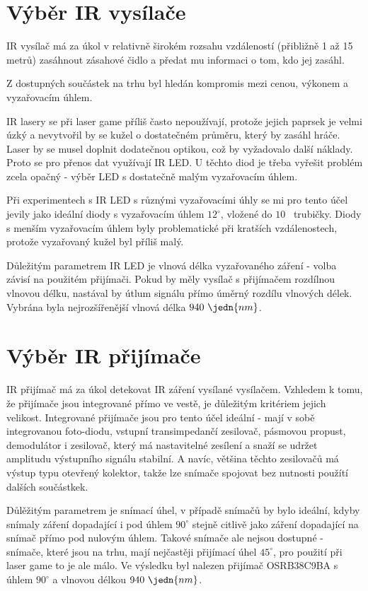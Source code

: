\section{Výběr IR vysílače}
IR vysílač má za úkol v relativně širokém rozsahu vzdáleností (přibližně 1 až 15 metrů) zasáhnout zásahové čidlo a předat mu informaci o tom, kdo jej zasáhl.

Z dostupných součástek na trhu byl hledán kompromis mezi cenou, výkonem a vyzařovacím úhlem.

IR lasery se při laser game příliš často nepoužívají, protože jejich paprsek je velmi úzký a nevytvořil by se kužel o dostatečném průměru, který by zasáhl hráče. Laser by se musel doplnit dodatečnou optikou, což by vyžadovalo další náklady. Proto se pro přenos dat využívají IR LED. U těchto diod je třeba vyřešit problém zcela opačný - výběr LED s dostatečně malým vyzařovacím úhlem.

Při experimentech s IR LED s různými vyzařovacími úhly se mi pro tento účel jevily jako ideální diody s vyzařovacím úhlem $12^\circ$, vložené do $10$~ trubičky. Diody s menším vyzařovacím úhlem byly problematické při kratších vzdálenostech, protože vyzařovaný kužel byl příliš malý.

Důležitým parametrem IR LED je vlnová délka vyzařovaného záření - volba závisí na použitém přijímači. Pokud by měly vysílač s přijímačem rozdílnou vlnovou délku, nastával by útlum signálu přímo úměrný rozdílu vlnových délek. Vybrána byla nejrozšířenější vlnová délka $940~\jedn{nm}$.

\section{Výběr IR přijímače}
IR přijímač má za úkol detekovat IR záření vysílané vysílačem. Vzhledem k tomu, že přijímače jsou integrované přímo ve vestě, je důležitým kritériem jejich velikost. Integrované přijímače jsou pro tento účel ideální - mají v sobě integrovanou foto-diodu, vstupní transimpedančí zesilovač, pásmovou propust, demodulátor i zesilovač, který má nastavitelné zesílení a snaží se udržet amplitudu výstupního signálu stabilní. A navíc, většina těchto zesilovačů má výstup typu otevřený kolektor, takže lze snímače spojovat bez nutnosti použítí dalších součástkek.

Důlěžitým parametrem je snímací úhel, v případě snímačů by bylo ideální, kdyby snímaly záření dopadající i pod úhlem $90^\circ$ stejně citlivě jako záření dopadající na snímač přímo pod nulovým úhlem. Takové snímače ale nejsou dostupné - snímače, které jsou na trhu, mají nejčastěji přijímací úhel $45^\circ$, pro použití při laser game to je ale málo. Ve výsledku byl nalezen přijímač OSRB38C9BA s úhlem $90^\circ$ a vlnovou délkou $940~\jedn{nm}$.

